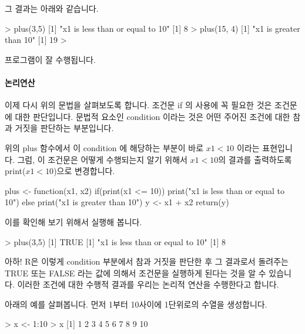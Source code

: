 그 결과는 아래와 같습니다. 

\begin{Schunk}
\begin{Soutput}
> plus(3,5)
[1] "x1 is less than or equal to 10"
[1] 8
> plus(15, 4)
[1] "x1 is greater than 10"
[1] 19
> 
\end{Soutput}
\end{Schunk}

프로그램이 잘 수행됩니다. 

\paragraph{논리연산}
이제 다시 위의 문법을 살펴보도록 합니다. 
조건문 if 의 사용에 꼭 필요한 것은 조건문에 대한 판단입니다.
문법적 요소인  condition 이라는 것은 어떤 주어진 조건에 대한 참과 거짓을 판단하는 부분입니다.

위의 plus 함수에서 이 condition 에 해당하는 부분이 바로 $x1 < 10$ 이라는 표현입니다. 
그럼, 이 조건문은 어떻게 수행되는지 알기 위해서 $x1 < 10$의 결과를 출력하도록 print($x1<10$)으로 변경합니다.
 
\begin{Schunk}
\begin{Soutput}
plus <- function(x1, x2){
	if(print(x1 <= 10)) print("x1 is less than or equal to 10")
	else print("x1 is greater than 10")
	y <- x1 + x2
	return(y)
}
\end{Soutput}
\end{Schunk}



이를 확인해 보기 위해서 실행해 봅니다. 
\begin{Schunk}
\begin{Soutput}
> plus(3,5)
[1] TRUE
[1] "x1 is less than or equal to 10"
[1] 8

\end{Soutput}
\end{Schunk}

아하! R은 이렇게 condition 부분에서 참과 거짓을 판단한 후 그 결과로서 돌려주는 TRUE 또는 FALSE 라는 값에 의해서 조건문을 실행하게 된다는 것을 알 수 있습니다. 
이러한 조건에 대한 수행적 결과를 우리는 논리적 연산을 수행한다고 합니다. 

아래의 예를 살펴봅니다.
먼저 1부터 10사이에 1단위로의 수열을 생성합니다.

\begin{Schunk}
\begin{Soutput}
> x <- 1:10
> x
 [1]  1  2  3  4  5  6  7  8  9 10
\end{Soutput}
\end{Schunk}

